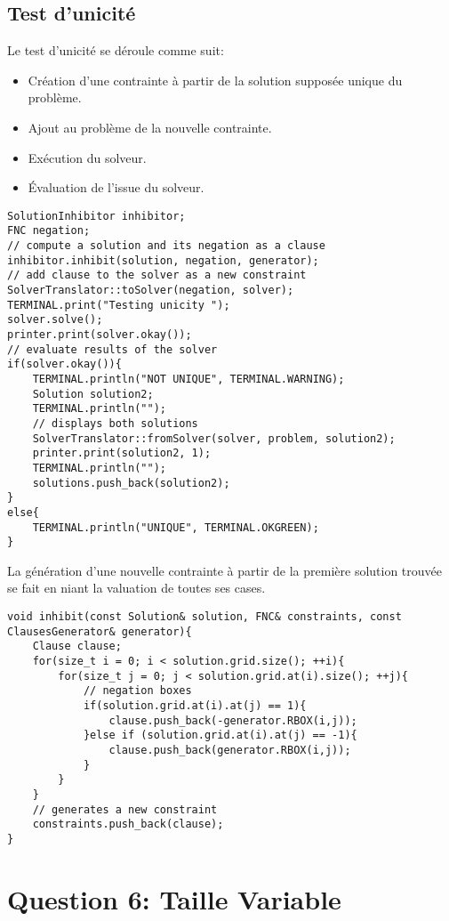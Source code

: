 \documentclass[a4paper,12pt]{report}
\begin{document}
\section{Test d'unicité}
Le test d'unicité se déroule comme suit:
\begin{itemize}
\item Création d'une contrainte à partir de la solution supposée unique du problème.
\item Ajout au problème de la nouvelle contrainte.
\item Exécution du solveur.
\item Évaluation de l'issue du solveur.\\ 
\end{itemize}
\lstset{style=Cpp, caption=Test d'unicité, label=C:Unicity}
\begin{lstlisting}[mathescape=true]
SolutionInhibitor inhibitor;
FNC negation;
// compute a solution and its negation as a clause
inhibitor.inhibit(solution, negation, generator);
// add clause to the solver as a new constraint
SolverTranslator::toSolver(negation, solver);
TERMINAL.print("Testing unicity ");
solver.solve();
printer.print(solver.okay());
// evaluate results of the solver
if(solver.okay()){
	TERMINAL.println("NOT UNIQUE", TERMINAL.WARNING);
	Solution solution2;
	TERMINAL.println("");
	// displays both solutions	
	SolverTranslator::fromSolver(solver, problem, solution2);
	printer.print(solution2, 1);
	TERMINAL.println("");
	solutions.push_back(solution2);
}
else{
	TERMINAL.println("UNIQUE", TERMINAL.OKGREEN);
}
\end{lstlisting}

La génération d'une nouvelle contrainte à partir de la première solution trouvée se fait en niant la valuation de toutes ses cases.
\lstset{style=Cpp, caption=Création de la contrainte, label=C:Constraint}
\begin{lstlisting}[mathescape=true]
void inhibit(const Solution& solution, FNC& constraints, const ClausesGenerator& generator){
	Clause clause;
	for(size_t i = 0; i < solution.grid.size(); ++i){
		for(size_t j = 0; j < solution.grid.at(i).size(); ++j){
			// negation boxes
			if(solution.grid.at(i).at(j) == 1){
				clause.push_back(-generator.RBOX(i,j));
			}else if (solution.grid.at(i).at(j) == -1){
				clause.push_back(generator.RBOX(i,j));
			}
		}
	}
	// generates a new constraint
	constraints.push_back(clause);
}
\end{lstlisting}

\chapter{Question 6: Taille Variable}
\end{document}
